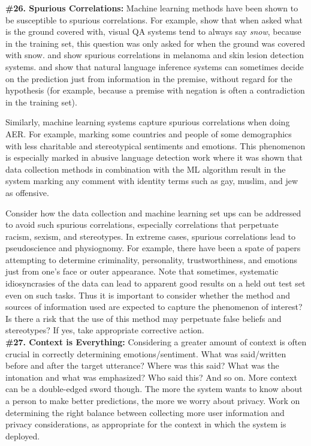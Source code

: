 \documentclass{clv3}
\begin{document}
\noindent \textbf{\#26. Spurious Correlations:} Machine learning methods have been shown to be susceptible to spurious correlations. For example, 
\citet{agrawal2016analyzing} show that  when asked what is the ground covered with, visual QA systems tend to always say \textit{snow}, because in the training set, this question was only asked for when the ground was covered with snow. \citet{winkler2019association} and \citet{bissoto2020debiasing} show spurious correlations in melanoma and skin lesion detection systems. \citet{poliak-etal-2018-hypothesis} and \citet{gururangan2018annotation} show that natural language inference systems can sometimes decide on the prediction just from information in the premise, without regard for the hypothesis (for example, because a premise with negation is often a contradiction in the training set).

Similarly, machine learning systems capture spurious correlations when doing AER. For example, marking some countries and people of some demographics with less charitable and stereotypical sentiments and emotions. This phenomenon is especially marked in abusive language detection work where it was shown that data collection methods in combination with the ML algorithm result in the system marking any comment with identity terms such as gay, muslim, and jew as offensive.

Consider how the data collection and machine learning set ups can be addressed to avoid such spurious correlations, especially correlations that perpetuate racism, sexism, and stereotypes.
In extreme cases, spurious correlations lead to pseudoscience and physiognomy. For example, there have been a spate of papers attempting to determine criminality, personality, trustworthiness, and emotions just from one’s face or outer appearance. Note that sometimes, systematic idiosyncrasies of the data can lead to apparent good results on a held out test set even on such tasks. Thus it is important to consider whether the method and sources of information used are expected to capture the phenomenon of interest? Is there a risk that the use of this method may perpetuate false beliefs and stereotypes? If yes, take appropriate corrective action.\\

\noindent \textbf{\#27. Context is Everything:} Considering a greater amount of context is often crucial in correctly determining emotions/sentiment. What was said/written before and after the target utterance? Where was this said? What was the intonation and what was emphasized? Who said this? And so on. More context can be a double-edged sword though. The more the system wants to know about a person to make better predictions, the more we worry about privacy.
Work on determining the right balance between collecting more user information and privacy considerations, as appropriate for the context in which the system is deployed.\\
\end{document}
